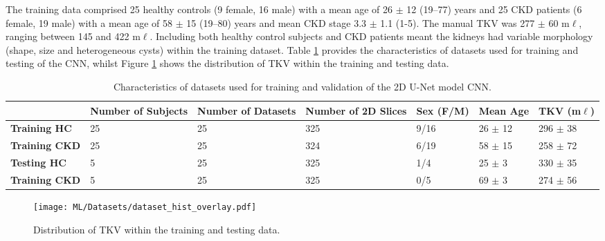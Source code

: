The training data comprised 25 healthy controls (9 female, 16 male) with a mean age of 26 $\pm$ 12 (19–77) years and 25 \ac{CKD} patients (6 female, 19 male) with a mean age of 58 $\pm$ 15 (19–80) years and mean \ac{CKD} stage 3.3 $\pm$ 1.1 (1-5). The manual \ac{TKV} was 277 $\pm$ 60 m$\ell$, ranging between 145 and 422 m$\ell$. Including both healthy control subjects and \ac{CKD} patients meant the kidneys had variable morphology (shape, size and heterogeneous cysts) within the training dataset. Table \ref{tab:ml_datasets} provides the characteristics of datasets used for training and testing of the \ac{CNN}, whilst Figure \ref{fig:ml_true_tkv_hist} shows the distribution of \ac{TKV} within the training and testing data.
\begin{table}[H]
	\centering
	\begin{adjustbox}{width=1.0\textwidth, center}
	\begin{tabularx}{1.1\textwidth}{X|X|X|X|X|X|X}
		& \textbf{Number of Subjects} & \textbf{Number of Datasets} & \textbf{Number of 2D Slices} & \textbf{Sex (F/M)} & \textbf{Mean Age} & \textbf{TKV (m$\ell$)} \\ \hline
		\textbf{Training HC}  & 25                          & 25                          & 325                          & 9/16               & 26 $\pm$ 12       & 296 $\pm$ 38           \\
		\hline
		\textbf{Training CKD} & 25                          & 25                          & 324                          & 6/19               & 58 $\pm$ 15       & 258 $\pm$ 72           \\
		\hline
		\textbf{Testing HC}   & 5                           & 25                          & 325                          & 1/4                & 25 $\pm$ 3        & 330 $\pm$ 35           \\
		\hline
		\textbf{Training CKD} & 5                           & 25                          & 325                          & 0/5                & 69 $\pm$ 3        & 274 $\pm$ 56          
	\end{tabularx}
	\end{adjustbox}
	\caption{Characteristics of datasets used for training and validation of the 2D U-Net model \ac{CNN}.}
	\label{tab:ml_datasets}
\end{table}
\begin{figure}[H]
	\centering
	\texttt{[image: ML/Datasets/dataset\_hist\_overlay.pdf]}
	\caption{Distribution of \ac{TKV} within the training and testing data.}
	\label{fig:ml_true_tkv_hist}	
\end{figure}

